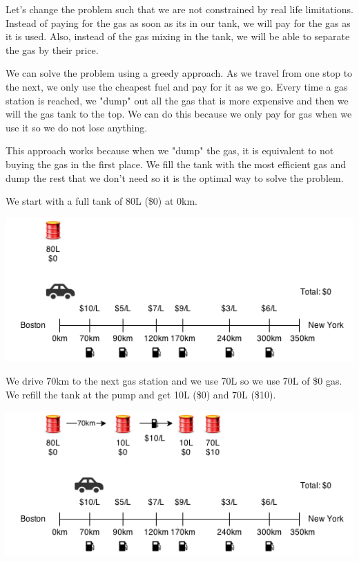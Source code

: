 \documentclass[11pt,oneside]{book}
\makeatletter
\def\maxwidth#1{\ifdim\Gin@nat@width>#1 #1\else\Gin@nat@width\fi}
\makeatother
\begin{document}
Let's change the problem such that we are not constrained by real life limitations. Instead of paying for the gas as soon as its in our tank, we will pay for the gas as it is used. Also, instead of the gas mixing in the tank, we will be able to separate the gas by their price.

We can solve the problem using a greedy approach. As we travel from one stop to the next, we only use the cheapest fuel and pay for it as we go. Every time a gas station is reached, we "dump" out all the gas that is more expensive and then we will the gas tank to the top. We can do this because we only pay for gas when we use it so we do not lose anything.

This approach works because when we "dump" the gas, it is equivalent to not buying the gas in the first place. We fill the tank with the most efficient gas and dump the rest that we don't need so it is the optimal way to solve the problem.

We start with a full tank of 80L (\$0) at 0km.

\vspace{5px}\includegraphics[width=\maxwidth{\textwidth}]{gasproblem1.png}

We drive 70km to the next gas station and we use 70L so we use 70L of \$0 gas. We refill the tank at the pump and get 10L (\$0) and 70L (\$10).

\vspace{5px}\includegraphics[width=\maxwidth{\textwidth}]{gasproblem2.png}
\end{document}
